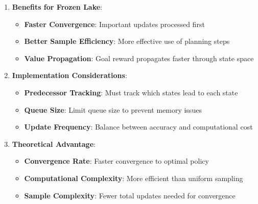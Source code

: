 \begin{itemize}
\begin{enumerate}
        \item \textbf{Benefits for Frozen Lake}:
        \begin{itemize}
            \item \textbf{Faster Convergence}: Important updates processed first
            \item \textbf{Better Sample Efficiency}: More effective use of planning steps
            \item \textbf{Value Propagation}: Goal reward propagates faster through state space
        \end{itemize}
        
        \item \textbf{Implementation Considerations}:
        \begin{itemize}
            \item \textbf{Predecessor Tracking}: Must track which states lead to each state
            \item \textbf{Queue Size}: Limit queue size to prevent memory issues
            \item \textbf{Update Frequency}: Balance between accuracy and computational cost
        \end{itemize}
        
        \item \textbf{Theoretical Advantage}:
        \begin{itemize}
            \item \textbf{Convergence Rate}: Faster convergence to optimal policy
            \item \textbf{Computational Complexity}: More efficient than uniform sampling
            \item \textbf{Sample Complexity}: Fewer total updates needed for convergence
        \end{itemize}
    \end{enumerate}
\end{itemize}